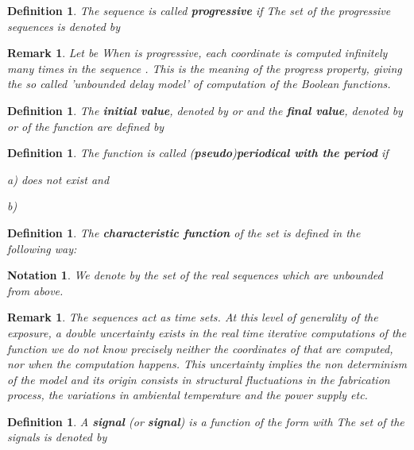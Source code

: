 \documentclass[12pt]{article}\usepackage{amsmath}
\newtheorem{definition}[theorem]{Definition}
\newtheorem{notation}[theorem]{Notation}
\newtheorem{remark}[theorem]{Remark}
\begin{document}
\begin{definition}
The sequence  is
called \textbf{progressive} if
The set of the progressive sequences is denoted by 
\end{definition}

\begin{remark}
Let be  When  is progressive, each coordinate  is computed infinitely many times in the sequence  . This is the meaning of
the progress property, giving the so called 'unbounded delay model' of
computation of the Boolean functions.
\end{remark}

\begin{definition}
The \textbf{initial value}, denoted by  or  and the \textbf{final
value}, denoted by  or  of the function  are defined by

\end{definition}

\begin{definition}
The function  is called
(\textbf{pseudo})\textbf{periodical with the period}  if

a)  does not exist and

b) 
\end{definition}

\begin{definition}
The \textbf{characteristic function}  of the set  is defined in the following way:

\end{definition}

\begin{notation}
We denote by  the set of the real sequences 
which are unbounded from above.
\end{notation}

\begin{remark}
The sequences  act as time sets. At this level of generality
of the exposure, a double uncertainty exists in the real time iterative
computations of the function 
we do not know precisely neither the coordinates  of  that are
computed, nor when the computation happens. This uncertainty implies the non
determinism of the model and its origin consists in structural fluctuations in
the fabrication process, the variations in ambiental temperature and the power
supply etc.
\end{remark}

\begin{definition}
A \textbf{signal} (or \textbf{signal}) is a function  of the form
with  The set of the signals is denoted by 
\end{definition}
\end{document}
